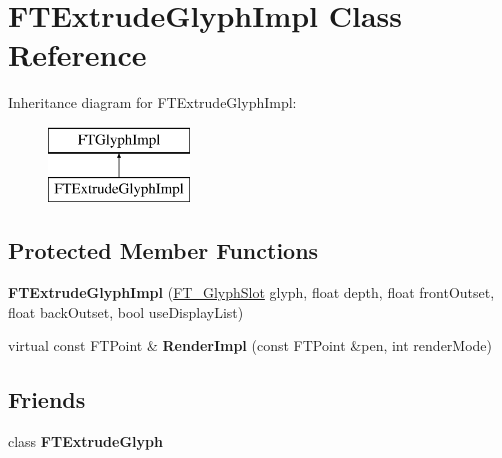 \hypertarget{class_f_t_extrude_glyph_impl}{\section{F\-T\-Extrude\-Glyph\-Impl Class Reference}
\label{class_f_t_extrude_glyph_impl}
}
Inheritance diagram for F\-T\-Extrude\-Glyph\-Impl\-:\begin{figure}[H]
\begin{center}
\leavevmode
\includegraphics[height=2.000000cm]{class_f_t_extrude_glyph_impl}
\end{center}
\end{figure}
\subsection*{Protected Member Functions}
\begin{DoxyCompactItemize}
\item 
\hypertarget{class_f_t_extrude_glyph_impl_adbfa8d05122539318f6caa8b77a5c291}{{\bfseries F\-T\-Extrude\-Glyph\-Impl} (\hyperlink{struct_f_t___glyph_slot_rec__}{F\-T\-\_\-\-Glyph\-Slot} glyph, float depth, float front\-Outset, float back\-Outset, bool use\-Display\-List)}\label{class_f_t_extrude_glyph_impl_adbfa8d05122539318f6caa8b77a5c291}

\item 
\hypertarget{class_f_t_extrude_glyph_impl_a7ba3363d6764a14a6954f068f626029b}{virtual const F\-T\-Point \& {\bfseries Render\-Impl} (const F\-T\-Point \&pen, int render\-Mode)}\label{class_f_t_extrude_glyph_impl_a7ba3363d6764a14a6954f068f626029b}

\end{DoxyCompactItemize}
\subsection*{Friends}
\begin{DoxyCompactItemize}
\item 
\hypertarget{class_f_t_extrude_glyph_impl_a43bdcab05c1db93d9474fee8176c1fb0}{class {\bfseries F\-T\-Extrude\-Glyph}}\label{class_f_t_extrude_glyph_impl_a43bdcab05c1db93d9474fee8176c1fb0}

\end{DoxyCompactItemize}
